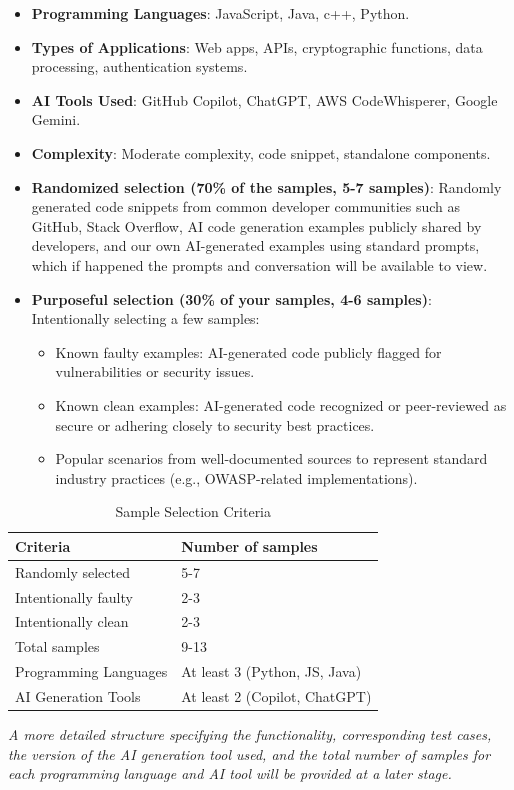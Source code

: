 \begin{itemize}
    \item \textbf{Programming Languages}: JavaScript, Java, c++, Python.
    \item \textbf{Types of Applications}: Web apps, APIs, cryptographic functions, data processing, authentication systems.
    \item \textbf{AI Tools Used}: GitHub Copilot, ChatGPT, AWS CodeWhisperer, Google Gemini.
    \item \textbf{Complexity}: Moderate complexity, code snippet, standalone components.
    \item \textbf{Randomized selection  (70\% of the samples, 5-7 samples)}: Randomly generated code snippets from common developer communities such as GitHub, Stack Overflow, AI code generation examples publicly shared by developers, and our own AI-generated examples using standard prompts, which if happened the prompts and conversation will be available to view.
    \item \textbf{Purposeful selection (30\% of your samples, 4-6 samples)}: Intentionally selecting a few samples:
    \begin{itemize}
        \item Known faulty examples: AI-generated code publicly flagged for vulnerabilities or security issues.
        \item Known clean examples: AI-generated code recognized or peer-reviewed as secure or adhering closely to security best practices.
        \item Popular scenarios from well-documented sources to represent standard industry practices (e.g., OWASP-related implementations).
    \end{itemize}
\end{itemize}

\begin{table}[h!]
    \caption{Sample Selection Criteria}
    \centering
    \renewcommand{\arraystretch}{1.4}
    \begin{tabular}{|l|l|}
    \hline
    \textbf{{Criteria}} & \textbf{{Number of samples}} \\
    \hline
    Randomly selected & 5-7 \\
    \hline
    Intentionally faulty & 2-3 \\
    \hline
    Intentionally clean & 2-3 \\
    \hline
    Total samples & 9-13 \\
    \hline
    Programming Languages & At least 3 (Python, JS, Java) \\
    \hline
    AI Generation Tools & At least 2 (Copilot, ChatGPT) \\
    \hline
    \end{tabular}
\end{table}
\vspace{-0.8em} 
\small\textit{A more detailed structure specifying the functionality, corresponding test cases, the version of the AI generation tool used, and the total number of samples for each programming language and AI tool will be provided at a later stage.}

